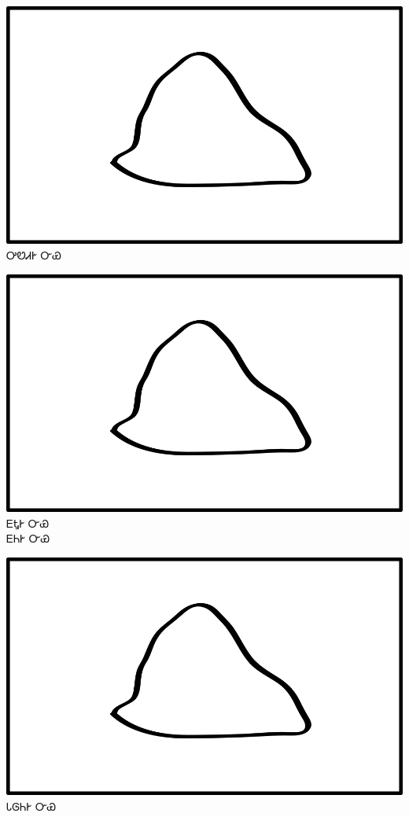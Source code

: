 \documentclass[avery5371]{flashcards}%
\begin{document}
    \begin{flashcard}{
        \includegraphics[width=0.95\columnwidth,height=.51\columnwidth,keepaspectratio]{../artwork/objects-neutral/nvya}
    }
        \Huge ᎤᏬᏗᎨ ᏅᏯ
    \end{flashcard}

    \begin{flashcard}{
        \includegraphics[width=0.95\columnwidth,height=.51\columnwidth,keepaspectratio]{../artwork/objects-neutral/nvya}
    }
        \Huge ᎬᎿᎨ ᏅᏯ\\ᎬᏂᎨ ᏅᏯ
    \end{flashcard}

    \begin{flashcard}{
        \includegraphics[width=0.95\columnwidth,height=.51\columnwidth,keepaspectratio]{../artwork/objects-neutral/nvya}
    }
        \Huge ᏓᎶᏂᎨ ᏅᏯ
    \end{flashcard}
\end{document}
